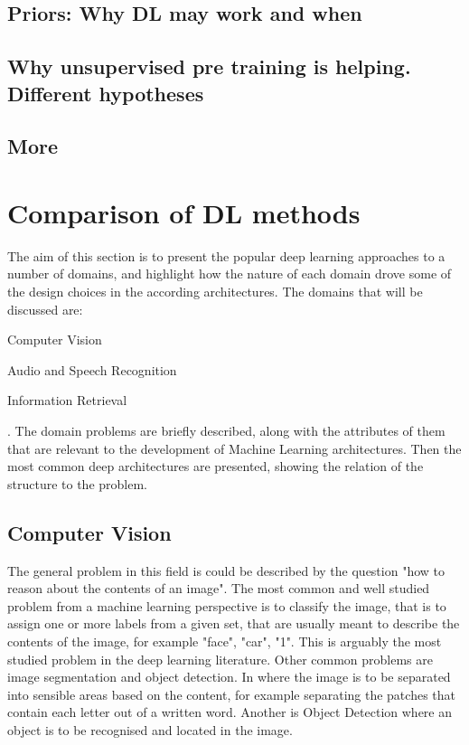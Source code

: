 \documentclass[a4paper]{report}
\begin{document}
	\subsection{Priors: Why DL may work and when}
	\subsection{Why unsupervised pre training is helping. Different hypotheses}	
	\subsection{More}
\section{Comparison of DL methods}
	The aim of this section is to present the popular deep learning approaches to a number of domains, and highlight how the nature of each domain drove some of the design choices in the according architectures. The domains that will be discussed are:
	\begin{enumerate*}
		\item Computer Vision
		\item Audio and Speech Recognition
		\item Information Retrieval
	\end{enumerate*}.	
	The domain problems are briefly described, along with the attributes of them that are relevant to the development of Machine Learning architectures. Then the most common deep architectures are presented, showing the relation of the structure to the problem.
	\subsection{Computer Vision}
		The general problem in this field is could be described by the question "how to reason about the contents of an image". 
		The most common and well studied problem from a machine learning perspective is to classify the image, that is to assign one or more labels from a given set, that are usually meant to describe the contents of the image, for example "face", "car", "1". This is arguably the most studied problem in the deep learning literature.
		Other common problems are image segmentation and object detection. In where the image is to be separated into sensible areas based on the content, for example separating the patches that contain each letter out of a written word. Another is Object Detection where an object is to be recognised and located in the image.
		
\end{document}
